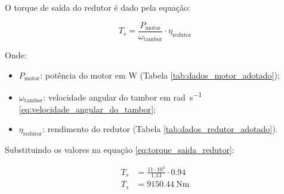 O torque de saída do redutor é dado pela equação:

\begin{equation}
  T_s = \frac{P_{\text{motor}}}{\omega_{\text{tambor}}} \cdot \eta_{\text{redutor}}
  \label{eq:torque_saida_redutor}
\end{equation}

Onde:

\begin{itemize}
  \item $P_{\text{motor}}$: potência do motor em \si{\watt} (Tabela \ref{tab:dados_motor_adotado});
  \item $\omega_{\text{tambor}}$: velocidade angular do tambor em \si{\radian\per\second} \eqref{eq:velocidade_angular_do_tambor};
  \item $\eta_{\text{redutor}}$: rendimento do redutor (Tabela \ref{tab:dados_redutor_adotado}).
\end{itemize}

\vspace{1em}

Substituindo os valores na equação \eqref{eq:torque_saida_redutor}:

\begin{align*}
  T_s & = \frac{11 \cdot 10^3}{\num{1.13}} \cdot \num{0.94} \\
  T_s & = \boxed{\SI{9150.44}{\newton\meter}}
\end{align*}
